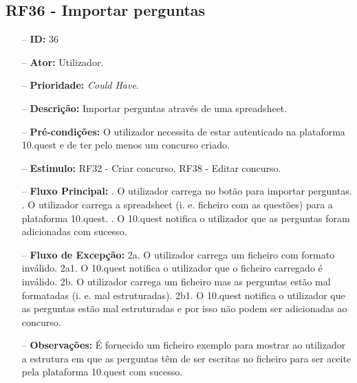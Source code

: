 \subsection{RF36 - Importar perguntas}
\begin{itemize}
	\item[--] \textbf{ID:} 36
	\item[--]  \textbf{Ator:} Utilizador.
	\item[--]  \textbf{Prioridade:} \textit{Could Have}.
	\item[--]  \textbf{Descrição:} Importar perguntas através de uma spreadsheet. 
	\item[--]  \textbf{Pré-condições:} O utilizador necessita de estar autenticado na plataforma 10.quest e de ter pelo menos um concurso criado.
	\item[--]  \textbf{Estimulo:}  
	\subitem RF32 - Criar concurso.
	\subitem RF38 - Editar concurso.
	\item[--]  \textbf{Fluxo Principal:} 
	. O utilizador carrega no botão para importar perguntas.
	. O utilizador carrega a spreadsheet (i. e. ficheiro com as questões) para a plataforma 10.quest.
	. O 10.quest notifica o utilizador que as perguntas foram adicionadas com sucesso.
	\item[--]  \textbf{Fluxo de Excepção:} 
	\subitem 2a. O utilizador carrega um ficheiro com formato inválido.
	\subitem 2a1. O 10.quest notifica o utilizador que o ficheiro carregado é inválido.
	\subitem 2b. O utilizador carrega um ficheiro mas as perguntas estão mal formatadas (i. e. mal estruturadas).
	\subitem 2b1. O 10.quest notifica o utilizador que as perguntas estão mal estruturadas e por isso não podem ser adicionadas ao concurso.
	\item[--]  \textbf{Observações:} É fornecido um ficheiro exemplo para mostrar ao utilizador a estrutura em que as perguntas têm de ser escritas no ficheiro para ser aceite pela plataforma 10.quest com sucesso.
\end{itemize}
\newpage

